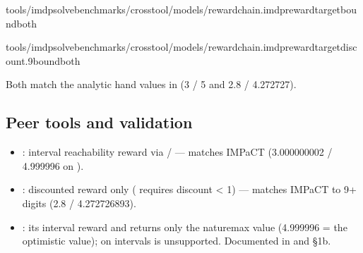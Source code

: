 \documentclass[a4paper,10pt,english]{sphinxmanual}
\begin{document}
\begin{sphinxVerbatim}[commandchars=\\\{\}]
tools/imdp\PYGZus{}solvebenchmarks/crosstool/models/reward\PYGZus{}chain.imdprewardtarget\PYGZhy{}\PYGZhy{}boundboth

tools/imdp\PYGZus{}solvebenchmarks/crosstool/models/reward\PYGZus{}chain.imdprewardtarget\PYGZhy{}\PYGZhy{}discount.9\PYGZhy{}\PYGZhy{}boundboth
\end{sphinxVerbatim}

\sphinxAtStartPar
Both match the analytic hand values in  (3 / 5 and
2.8 / 4.272727).


\subsection{Peer tools and validation}
\label{\detokenize{manual/rewards:peer-tools-and-validation}}\begin{itemize}
\item {} 
\sphinxAtStartPar
{}: interval reachability reward via  /  — matches
IMPaCT (3.000000002 / 4.999996 on ).

\item {} 
\sphinxAtStartPar
{}: discounted reward only ( requires
discount \textless{} 1) — matches IMPaCT to 9+ digits (2.8 / 4.272726893).

\item {} 
\sphinxAtStartPar
{}: its interval reward   and
returns only the nature\sphinxhyphen{}max value (4.999996 = the optimistic value);  on
intervals is unsupported. Documented in  and
 \S{}1b.

\end{itemize}
\end{document}

